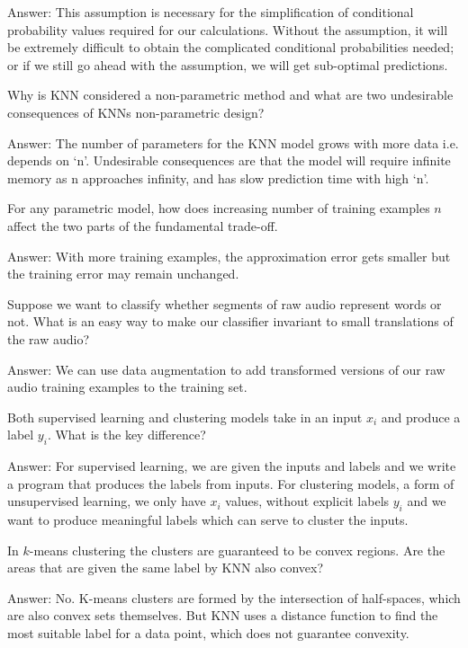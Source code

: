 \documentclass{article}
\def\ans#1{\par\gre{Answer: #1}}
\def\gre#1{{\color{gre}#1}}
\begin{document}
{ \ans {This assumption is necessary for the simplification of conditional probability values required for our calculations. Without the assumption, it will be extremely difficult to obtain the complicated conditional probabilities needed; or if we still go ahead with the assumption, we will get sub-optimal predictions.}
\item Why is KNN considered a non-parametric method and what are two undesirable consequences of KNNs non-parametric design?
 \ans {The number of parameters for the KNN model grows with more data i.e. depends on `n'. Undesirable consequences are that the model will require infinite memory as n approaches infinity, and has slow prediction time with high `n'. }
\item For any parametric model, how does increasing number of training examples $n$ affect the two parts of the fundamental trade-off.
 \ans {With more training examples, the approximation error gets smaller but the training error may remain unchanged.}
\item Suppose we want to classify whether segments of raw audio represent words or not. What is an easy way to make our classifier invariant to small translations of the raw audio?
 \ans {We can use data augmentation to add transformed versions of our raw audio training examples to the training set.}
\item Both supervised learning and clustering models take in an input $x_i$ and produce a label $y_i$. What is the key difference?
 \ans {For supervised learning, we are given the inputs and labels and we write a program that produces the labels from inputs. For clustering models, a form of unsupervised learning, we only have $x_i$ values, without explicit labels $y_i$ and we want to produce meaningful labels which can serve to cluster the inputs.}
\item In $k$-means clustering the clusters are guaranteed to be convex regions. Are the areas that are given the same label by KNN also convex?
 \ans {No. K-means clusters are formed by the intersection of half-spaces, which are also convex sets themselves. But KNN uses a distance function to find the most suitable label for a data point, which does not guarantee convexity.}
 }
\end{document}
